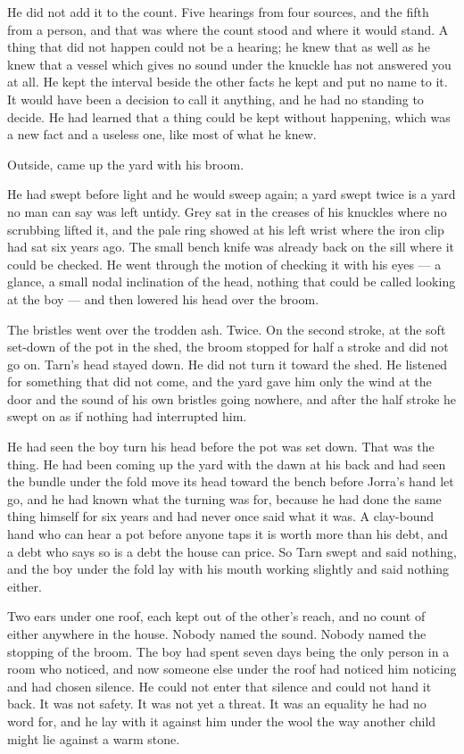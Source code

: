 He did not add it to the count. Five hearings from four sources, and the fifth from a person, and that was where the count stood and where it would stand. A thing that did not happen could not be a hearing; he knew that as well as he knew that a vessel which gives no sound under the knuckle has not answered you at all. He kept the interval beside the other facts he kept and put no name to it. It would have been a decision to call it anything, and he had no standing to decide. He had learned that a thing could be kept without happening, which was a new fact and a useless one, like most of what he knew.

Outside,  came up the yard with his broom.

He had swept before light and he would sweep again; a yard swept twice is a yard no man can say was left untidy. Grey  sat in the creases of his knuckles where no scrubbing lifted it, and the pale ring showed at his left wrist where the iron clip had sat six years ago. The small bench knife was already back on the sill where it could be checked. He went through the motion of checking it with his eyes --- a glance, a small nodal inclination of the head, nothing that could be called looking at the boy --- and then lowered his head over the broom.

The bristles went over the trodden ash. Twice. On the second stroke, at the soft set-down of the pot in the shed, the broom stopped for half a stroke and did not go on. Tarn's head stayed down. He did not turn it toward the shed. He listened for something that did not come, and the yard gave him only the wind at the door and the sound of his own bristles going nowhere, and after the half stroke he swept on as if nothing had interrupted him.

He had seen the boy turn his head before the pot was set down. That was the thing. He had been coming up the yard with the dawn at his back and had seen the bundle under the fold move its head toward the bench before Jorra's hand let go, and he had known what the turning was for, because he had done the same thing himself for six years and had never once said what it was. A clay-bound hand who can hear a pot before anyone taps it is worth more than his debt, and a debt who says so is a debt the house can price. So Tarn swept and said nothing, and the boy under the fold lay with his mouth working slightly and said nothing either.

Two ears under one roof, each kept out of the other's reach, and no count of either anywhere in the house. Nobody named the sound. Nobody named the stopping of the broom. The boy had spent seven days being the only person in a room who noticed, and now someone else under the roof had noticed him noticing and had chosen silence. He could not enter that silence and could not hand it back. It was not safety. It was not yet a threat. It was an equality he had no word for, and he lay with it against him under the wool the way another child might lie against a warm stone.

